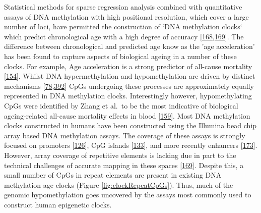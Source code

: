 \documentclass[
]{book}
\begin{document}
Statistical methods for sparse regression analysis combined with quantitative assays of DNA methylation with high positional resolution, which cover a large number of loci, have permitted the construction of `DNA methylation clocks` which predict chronological age with a high degree of accuracy {[}\protect\hyperlink{ref-Horvath2018}{168},\protect\hyperlink{ref-Bell2019}{169}{]}.
The difference between chronological and predicted age know as the 'age acceleration' has been found to capture aspects of biological ageing in a number of these clocks.
For example, Age acceleration is a strong predictor of all-cause mortality {[}\protect\hyperlink{ref-Marioni2015}{154}{]}.
Whilst DNA hypermethylation and hypomethylation are driven by distinct mechanisms {[}\protect\hyperlink{ref-Wu2017}{78},\protect\hyperlink{ref-Mozhui2017}{392}{]} CpGs undergoing these processes are approximately equally represented in DNA methylation clocks.
Interestingly however, hypomethylating CpGs were identified by Zhang et al.~to be the most indicative of biological ageing-related all-cause mortality effects in blood {[}\protect\hyperlink{ref-Zhang2017}{159}{]}.
Most DNA methylation clocks constructed in humans have been constructed using the Illumina bead chip array based DNA methylation assays.
The coverage of these assays is strongly focused on promoters {[}\protect\hyperlink{ref-Bibikova2009}{126}{]}, CpG islands {[}\protect\hyperlink{ref-Bibikova2011}{133}{]}, and more recently enhancers {[}\protect\hyperlink{ref-Moran2015}{173}{]}.
However, array coverage of repetitive elements is lacking due in part to the technical challenges of accurate mapping in these spaces {[}\protect\hyperlink{ref-Bell2019}{169}{]}.
Despite this, a small number of CpGs in repeat elements are present in existing DNA methylation age clocks (Figure \ref{fig:clockRepeatCpGs}).
Thus, much of the genomic hypomethylation goes uncovered by the assays most commonly used to construct human epigenetic clocks.
\end{document}
